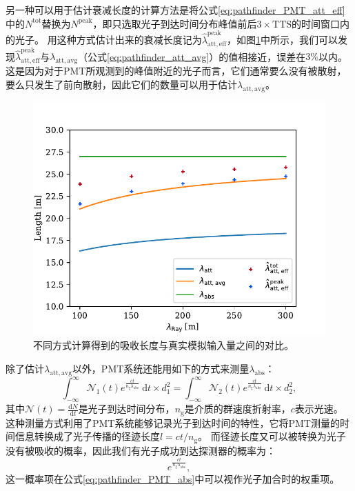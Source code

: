 另一种可以用于估计衰减长度的计算方法是将公式\ref{eq:pathfinder_PMT_att_eff}中的$N^\mathrm{tot}$替换为$N^\mathrm{peak}$，即只选取光子到达时间分布峰值前后$3 \times \mathrm{TTS}$的时间窗口内的光子。
用这种方式估计出来的衰减长度记为$\hat{\lambda} _\mathrm{att,eff} ^\mathrm{peak}$，如图\ref{fig:pathfinder_sim_PMT_att}中所示，我们可以发现$\hat{\lambda} _\mathrm{att,eff} ^\mathrm{peak}$与$\lambda _\mathrm{att,avg}$（公式\ref{eq:pathfinder_att_avg}）的值相接近，误差在$3\%$以内。
这是因为对于PMT所观测到的峰值附近的光子而言，它们通常要么没有被散射，要么只发生了前向散射，因此它们的数量可以用于估计$\lambda _\mathrm{att,avg}$。

\begin{figure}[!ht]
    \centering
    \includegraphics[width=0.8\linewidth]{img/pathfinder_sim_PMT_att.pdf}
    \caption{不同方式计算得到的吸收长度与真实模拟输入量之间的对比。}
    \label{fig:pathfinder_sim_PMT_att}
\end{figure}


除了估计$\lambda _\mathrm{att,avg}$以外，PMT系统还能用如下的方式来测量$\lambda _\mathrm{abs}$：
\begin{equation}
    \int_{-\infty}^{\infty} \mathcal{N}_1(t) e^{\frac{c t}{n_\mathrm{g} \lambda_\mathrm{abs}}} ~\mathrm{d}t \times d_1^2 = 
    \int_{-\infty}^{\infty} \mathcal{N}_2(t) e^{\frac{c t}{n_\mathrm{g} \lambda_\mathrm{abs}}} ~\mathrm{d}t \times d_2^2 ,
    \label{eq:pathfinder_PMT_abs}
\end{equation}
其中$\mathcal{N}(t) = \frac{\mathrm{d}N}{\mathrm{d}t}$是光子到达时间分布，$n_\mathrm{g}$是介质的群速度折射率，$c$表示光速。
这种测量方式利用了PMT系统能够记录光子到达时间的特性，它将PMT测量的时间信息转换成了光子传播的径迹长度$l = c t / n_\mathrm{g}$。
而径迹长度又可以被转换为光子没有被吸收的概率，因此我们有光子成功到达探测器的概率为：
\begin{equation}
    e^{\frac{c t}{n_\mathrm{g} \lambda_\mathrm{abs}}} ,
\end{equation}
这一概率项在公式\ref{eq:pathfinder_PMT_abs}中可以视作光子加合时的权重项。

